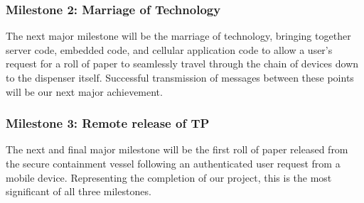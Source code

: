 \subsubsection*{Milestone 2: Marriage of Technology}
\par The next major milestone will be the marriage of technology, bringing together server code, embedded code, and cellular application code to allow a user's request for a roll of paper to seamlessly travel through the chain of devices down to the dispenser itself.  Successful transmission of messages between these points will be our next major achievement.

\subsubsection*{Milestone 3: Remote release of TP}
\par The next and final major milestone will be the first roll of paper released from the secure containment vessel following an authenticated user request from a mobile device.  Representing the completion of our project, this is the most significant of all three milestones.
